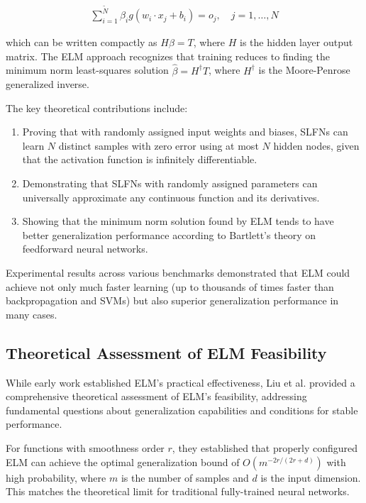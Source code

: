 \documentclass[11pt]{article}
\begin{document}
\begin{align}
\sum_{i=1}^{\tilde{N}} \beta_i g(w_i \cdot x_j + b_i) = o_j, \quad j = 1, \ldots, N
\end{align}

which can be written compactly as $H\beta = T$, where $H$ is the hidden layer output matrix. The ELM approach recognizes that training reduces to finding the minimum norm least-squares solution $\hat{\beta} = H^{\dagger}T$, where $H^{\dagger}$ is the Moore-Penrose generalized inverse.

The key theoretical contributions include:

\begin{enumerate}
    \item Proving that with randomly assigned input weights and biases, SLFNs can learn $N$ distinct samples with zero error using at most $N$ hidden nodes, given that the activation function is infinitely differentiable.
    
    \item Demonstrating that SLFNs with randomly assigned parameters can universally approximate any continuous function and its derivatives.
    
    \item Showing that the minimum norm solution found by ELM tends to have better generalization performance according to Bartlett's theory on feedforward neural networks.
\end{enumerate}

Experimental results across various benchmarks demonstrated that ELM could achieve not only much faster learning (up to thousands of times faster than backpropagation and SVMs) but also superior generalization performance in many cases.

\subsection{Theoretical Assessment of ELM Feasibility}

While early work established ELM's practical effectiveness, Liu et al. \citep{Liu2015} provided a comprehensive theoretical assessment of ELM's feasibility, addressing fundamental questions about generalization capabilities and conditions for stable performance.

For functions with smoothness order $r$, they established that properly configured ELM can achieve the optimal generalization bound of $O(m^{-2r/(2r+d)})$ with high probability, where $m$ is the number of samples and $d$ is the input dimension. This matches the theoretical limit for traditional fully-trained neural networks.
\end{document}

